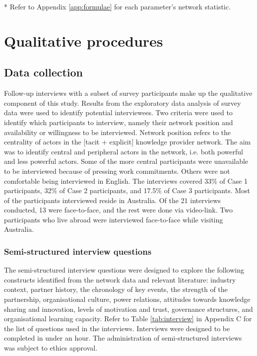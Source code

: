 \begin{table}[hbt!]
{\begin{threeparttable}
\begin{tablenotes}
\footnotesize
\item[*] Refer to Appendix \ref{app:formulae} for each parameter's network statistic.
\end{tablenotes}
\end{threeparttable}
}%
\end{table}

\section{Qualitative procedures}

\subsection{Data collection}

Follow-up interviews with a subset of survey participants make up the qualitative component of this study. Results from the exploratory data analysis of survey data were used to identify potential interviewees. Two criteria were used to identify which participants to interview, namely their network position and availability or willingness to be interviewed. Network position refers to the centrality of actors in the [tacit + explicit] knowledge provider network. The aim was to identify central and peripheral actors in the network, i.e. both powerful and less powerful actors. Some of the more central participants were unavailable to be interviewed because of pressing work commitments. Others were not comfortable being interviewed in English. The interviews covered 33\% of Case 1 participants, 32\% of Case 2 participants, and 17.5\% of Case 3 participants. Most of the participants interviewed reside in Australia. Of the 21 interviews conducted, 13 were face-to-face, and the rest were done via video-link. Two participants who live abroad were interviewed face-to-face while visiting Australia. \medskip

\subsubsection{Semi-structured interview questions}

The semi-structured interview questions were designed to explore the following constructs identified from the network data and relevant literature: industry context, partner history, the chronology of key events, the strength of the partnership, organisational culture, power relations, attitudes towards knowledge sharing and innovation, levels of motivation and trust, governance structures, and organisational learning capacity. Refer to Table \ref{tab:interview} in Appendix C for the list of questions used in the interviews. Interviews were designed to be completed in under an hour. The administration of semi-structured interviews was subject to ethics approval. 

